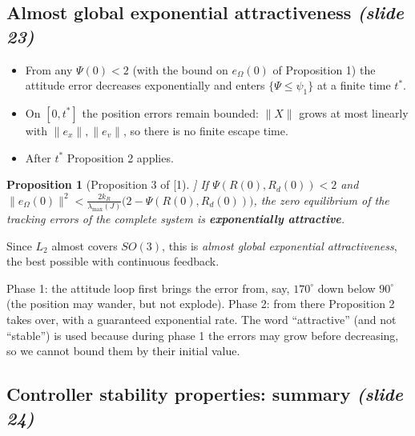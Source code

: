\documentclass[11pt,a4paper]{article}
\newcommand{\eO}{e_\Omega}
\newcommand{\ex}{e_x}
\newcommand{\ev}{e_v}
\newcommand{\lmax}{\lambda_{\max}}
\newcommand{\sli}[1]{\emph{(#1)}}
\theoremstyle{definition}
\theoremstyle{plain}
\newtheorem{proposition}[definition]{Proposition}
\theoremstyle{remark}
\begin{document}
\subsection{Almost global exponential attractiveness \sli{slide 23}}

\begin{itemize}
  \item From any $\Psi(0)<2$ (with the bound on $\eO(0)$ of Proposition 1) the attitude error decreases exponentially and enters $\{\Psi\le\psi_1\}$ at a finite time $t^\ast$.
  \item On $[0,t^\ast]$ the position errors remain bounded: $\|X\|$ grows at most linearly with $\|\ex\|,\|\ev\|$, so there is no finite escape time.
  \item After $t^\ast$ Proposition 2 applies.
\end{itemize}

\begin{proposition}[Proposition 3 of [1]]
If $\Psi(R(0),R_d(0))<2$ and $\|\eO(0)\|^2<\frac{2k_R}{\lmax(J)}\big(2-\Psi(R(0),R_d(0))\big)$, the zero equilibrium of the tracking errors of the complete system is \textbf{exponentially attractive}.
\end{proposition}

Since $L_2$ almost covers $SO(3)$, this is \emph{almost global exponential attractiveness}, the best possible with continuous feedback.

\begin{intuition}
Phase 1: the attitude loop first brings the error from, say, $170^\circ$ down below $90^\circ$ (the position may wander, but not explode). Phase 2: from there Proposition 2 takes over, with a guaranteed exponential rate. The word ``attractive'' (and not ``stable'') is used because during phase 1 the errors may grow before decreasing, so we cannot bound them by their initial value.
\end{intuition}

\subsection{Controller stability properties: summary \sli{slide 24}}
\end{document}
